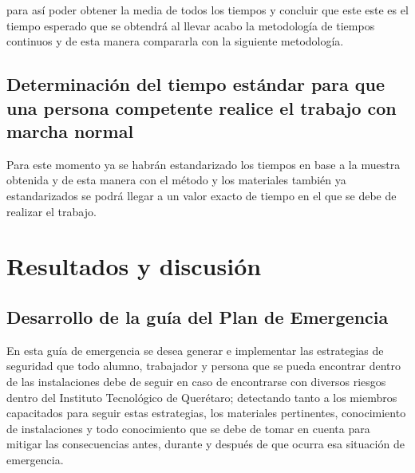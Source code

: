         para así poder obtener la media de todos los tiempos y concluir que este este es el tiempo esperado que se obtendrá al llevar acabo la metodología de tiempos continuos y de esta manera compararla con la siguiente metodología.

     \subsection{Determinación del tiempo estándar para que una persona competente realice el trabajo con marcha normal}
Para este momento ya se habrán estandarizado los tiempos en base a la muestra obtenida y de esta manera con el método y los materiales también ya estandarizados se podrá llegar a un valor exacto de tiempo en el que se debe de realizar el trabajo.
    
    

    
    
    
    \section{Resultados y discusión}

    \subsection{Desarrollo de la guía del Plan de Emergencia}

    En esta guía de emergencia se desea generar e implementar las estrategias de seguridad que todo alumno, trabajador y  persona que se pueda encontrar dentro de las instalaciones debe de seguir en caso de encontrarse con diversos riesgos dentro del Instituto Tecnológico de Querétaro; detectando tanto a los miembros capacitados para seguir estas estrategias, los materiales pertinentes, conocimiento de instalaciones y todo conocimiento que se debe de tomar en cuenta para mitigar las consecuencias antes, durante y después de que ocurra esa situación de emergencia.
    
